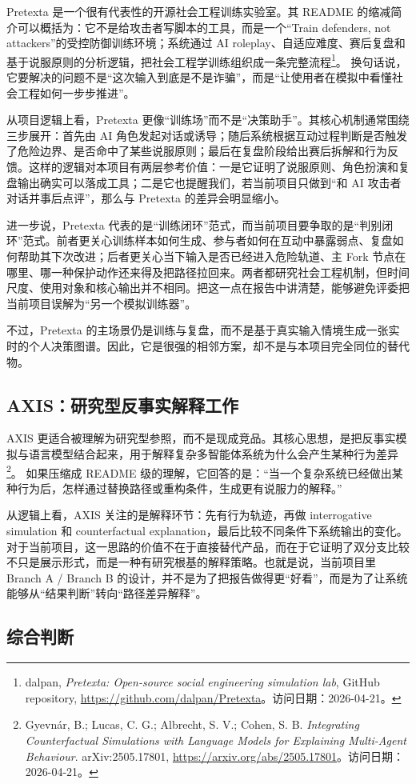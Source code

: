 \documentclass[12pt,a4paper]{ctexart}
\newcommand{\ResearchDate}{2026-04-21}
\newcommand{\SrcAxis}{\footnote{Gyevnár, B.; Lucas, C. G.; Albrecht, S. V.; Cohen, S. B. \emph{Integrating Counterfactual Simulations with Language Models for Explaining Multi-Agent Behaviour}. arXiv:2505.17801, \url{https://arxiv.org/abs/2505.17801}。访问日期：\ResearchDate。}}
\newcommand{\SrcPretexta}{\footnote{dalpan, \emph{Pretexta: Open-source social engineering simulation lab}, GitHub repository, \url{https://github.com/dalpan/Pretexta}。访问日期：\ResearchDate。}}
\begin{document}
Pretexta 是一个很有代表性的开源社会工程训练实验室。其 README 的缩减简介可以概括为：它不是给攻击者写脚本的工具，而是一个“Train defenders, not attackers”的受控防御训练环境；系统通过 AI roleplay、自适应难度、赛后复盘和基于说服原则的分析逻辑，把社会工程学训练组织成一条完整流程\SrcPretexta。 换句话说，它要解决的问题不是“这次输入到底是不是诈骗”，而是“让使用者在模拟中看懂社会工程如何一步步推进”。

从项目逻辑上看，Pretexta 更像“训练场”而不是“决策助手”。其核心机制通常围绕三步展开：首先由 AI 角色发起对话或诱导；随后系统根据互动过程判断是否触发了危险边界、是否命中了某些说服原则；最后在复盘阶段给出赛后拆解和行为反馈。这样的逻辑对本项目有两层参考价值：一是它证明了说服原则、角色扮演和复盘输出确实可以落成工具；二是它也提醒我们，若当前项目只做到“和 AI 攻击者对话并事后点评”，那么与 Pretexta 的差异会明显缩小。

进一步说，Pretexta 代表的是“训练闭环”范式，而当前项目要争取的是“判别闭环”范式。前者更关心训练样本如何生成、参与者如何在互动中暴露弱点、复盘如何帮助其下次改进；后者更关心当下输入是否已经进入危险轨道、主 Fork 节点在哪里、哪一种保护动作还来得及把路径拉回来。两者都研究社会工程机制，但时间尺度、使用对象和核心输出并不相同。把这一点在报告中讲清楚，能够避免评委把当前项目误解为“另一个模拟训练器”。

不过，Pretexta 的主场景仍是训练与复盘，而不是基于真实输入情境生成一张实时的个人决策图谱。因此，它是很强的相邻方案，却不是与本项目完全同位的替代物。

\subsection{AXIS：研究型反事实解释工作}

AXIS 更适合被理解为研究型参照，而不是现成竞品。其核心思想，是把反事实模拟与语言模型结合起来，用于解释复杂多智能体系统为什么会产生某种行为差异\SrcAxis。 如果压缩成 README 级的理解，它回答的是：“当一个复杂系统已经做出某种行为后，怎样通过替换路径或重构条件，生成更有说服力的解释。”

从逻辑上看，AXIS 关注的是解释环节：先有行为轨迹，再做 interrogative simulation 和 counterfactual explanation，最后比较不同条件下系统输出的变化。对于当前项目，这一思路的价值不在于直接替代产品，而在于它证明了双分支比较不只是展示形式，而是一种有研究根基的解释策略。也就是说，当前项目里 Branch A / Branch B 的设计，并不是为了把报告做得更“好看”，而是为了让系统能够从“结果判断”转向“路径差异解释”。

\subsection{综合判断}
\end{document}
